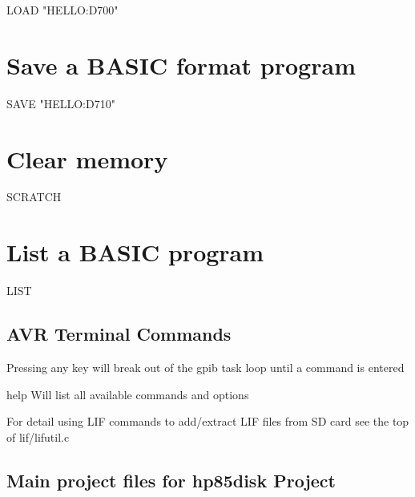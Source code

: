 \begin{DoxyPre}
  LOAD "HELLO:D700"
\section*{Save a BASIC format program}\end{DoxyPre}



\begin{DoxyPre}
  SAVE "HELLO:D710"
\section*{Clear memory}\end{DoxyPre}



\begin{DoxyPre}
  SCRATCH
\section*{List a BASIC program}\end{DoxyPre}



\begin{DoxyPre}
  LIST
\end{DoxyPre}
 



\subsection*{A\+VR Terminal Commands}


\begin{DoxyItemize}
\item Pressing any key will break out of the gpib task loop until a command is entered
\begin{DoxyItemize}
\item help Will list all available commands and options
\item For detail using L\+IF commands to add/extract L\+IF files from SD card see the top of lif/lifutil.\+c 


\end{DoxyItemize}
\end{DoxyItemize}

\subsection*{Main project files for hp85disk Project}


